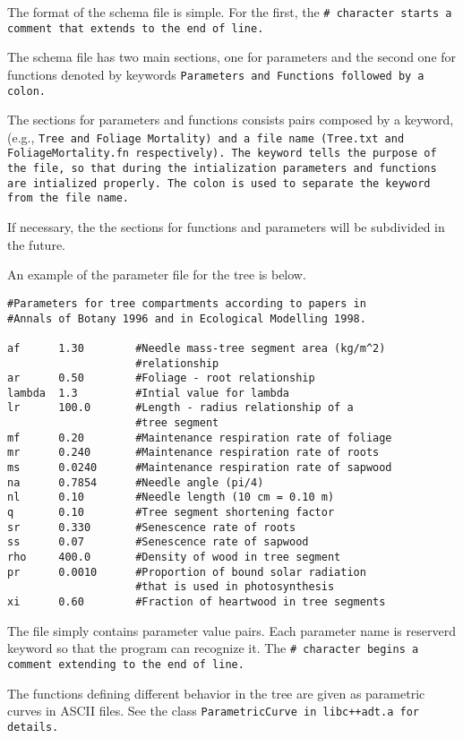 The format of the schema file is simple. For the first, the \tt \# \rm
character starts a comment that extends to the end of line.  

The schema file has two main sections, one for parameters and
the second one for functions denoted by keywords 
\tt Parameters \rm and \tt Functions \rm followed by a colon.
 
The sections for parameters and functions consists pairs
composed by a keyword,(e.g., \tt Tree \rm and 
\tt Foliage Mortality\rm) and a file name
(\tt Tree.txt \rm and \tt FoliageMortality.fn \rm respectively). 
The keyword tells the purpose of the file, so that
during the intialization parameters and functions are
intialized properly. The colon is used to separate the
keyword from the file name.

If necessary, the the sections for functions and parameters
will be subdivided in the future. 

An example of the parameter file for the tree is below.

\begin{verbatim}
#Parameters for tree compartments according to papers in
#Annals of Botany 1996 and in Ecological Modelling 1998.

af      1.30        #Needle mass-tree segment area (kg/m^2)
                    #relationship
ar      0.50        #Foliage - root relationship 
lambda  1.3         #Intial value for lambda
lr      100.0       #Length - radius relationship of a 
                    #tree segment
mf      0.20        #Maintenance respiration rate of foliage
mr      0.240       #Maintenance respiration rate of roots
ms      0.0240      #Maintenance respiration rate of sapwood
na      0.7854      #Needle angle (pi/4)
nl      0.10        #Needle length (10 cm = 0.10 m) 
q       0.10        #Tree segment shortening factor
sr      0.330       #Senescence rate of roots
ss      0.07        #Senescence rate of sapwood
rho     400.0       #Density of wood in tree segment
pr      0.0010      #Proportion of bound solar radiation
                    #that is used in photosynthesis
xi      0.60        #Fraction of heartwood in tree segments
\end{verbatim}

The file simply contains parameter value pairs. Each parameter
name is reserverd keyword so that the program can recognize it.
The \tt \# \rm character begins a comment extending to the end of line.

The functions defining different behavior in the tree are given
as parametric curves in ASCII files. See the class 
\tt ParametricCurve \rm in \tt libc++adt.a \rm for details.

